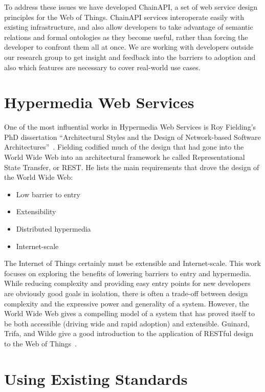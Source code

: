 \documentclass{acm_proc_article-sp}
\newenvironment{tightitemize}{
    \vspace{-10pt}
    \begin{itemize}
        \setlength{\parskip}{-1pt}}{
    \end{itemize}
    \vspace{-10pt}}
\begin{document}
To address these issues we have developed ChainAPI, a set of web service design
principles for the Web of Things. ChainAPI services interoperate easily with
existing infrastructure, and also allow developers to take advantage of
semantic relations and formal ontologies as they become useful, rather than
forcing the developer to confront them all at once. We are working with
developers outside our research group to get insight and feedback into the
barriers to adoption and also which features are necessary to cover real-world
use cases.

\section{Hypermedia Web Services}

One of the most influential works in Hypermedia Web Services is Roy Fielding's
PhD dissertation ``Architectural Styles and the Design of Network-based
Software Architectures''~\cite{fielding}. Fielding codified much of the design
that had gone into the World Wide Web into an architectural framework he called
Representational State Transfer, or REST. He lists the main requirements that
drove the design of the World Wide Web:

\begin{tightitemize}
    \item Low barrier to entry
    \item Extensibility
    \item Distributed hypermedia
    \item Internet-scale
\end{tightitemize}

The Internet of Things certainly must be extensible and Internet-scale. This
work focuses on exploring the benefits of lowering barriers to entry and
hypermedia. While reducing complexity and providing easy entry points for new
developers are obviously good goals in isolation, there is often a trade-off
between design complexity and the expressive power and generality of a system.
However, the World Wide Web gives a compelling model of a system that has
proved itself to be both accessible (driving wide and rapid adoption) and
extensible. Guinard, Trifa, and Wilde give a good introduction to the
application of RESTful design to the Web of Things~\cite{guinard2010}.

\section{Using Existing Standards}
\end{document}
